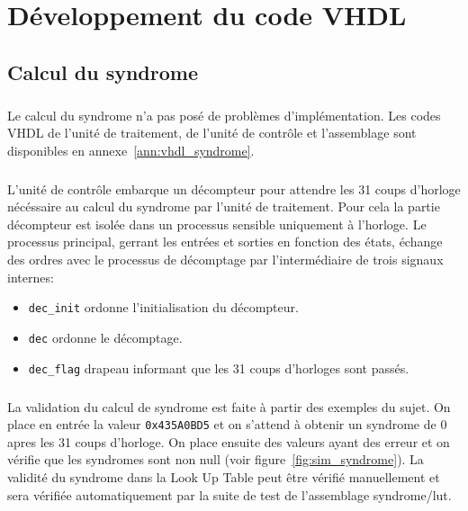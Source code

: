 \documentclass[a4paper, 11pt, svgnames]{report}
\begin{document}
    \chapter{Développement du code VHDL}
        \section{Calcul du syndrome}
            \paragraph{}
            Le calcul du syndrome n'a pas posé de problèmes d'implémentation.
            Les codes VHDL de l'unité de traitement, de l'unité de contrôle et
            l'assemblage sont disponibles en annexe~\ref{ann:vhdl_syndrome}.

            \paragraph{}
            L'unité de contrôle embarque un décompteur pour attendre les 31
            coups d'horloge nécéssaire au calcul du syndrome par l'unité de
            traitement. Pour cela la partie décompteur est isolée dans un
            processus sensible uniquement à l'horloge. Le processus principal,
            gerrant les entrées et sorties en fonction des états, échange des
            ordres avec le processus de décomptage par l'intermédiaire de trois
            signaux internes:
            \begin{itemize}
                \item \verb$dec_init$ ordonne l'initialisation du décompteur.
                \item \verb$dec$ ordonne le décomptage.
                \item \verb$dec_flag$ drapeau informant que les 31 coups
                    d'horloges sont passés.
            \end{itemize}

            \paragraph{}
            La validation du calcul de syndrome est faite à partir des exemples
            du sujet. On place en entrée la valeur \verb$0x435A0BD5$ et on
            s'attend à obtenir un syndrome de 0 apres les 31 coups d'horloge.
            On place ensuite des valeurs ayant des erreur et on vérifie que les
            syndromes sont non null (voir figure~\ref{fig:sim_syndrome}). La
            validité du syndrome dans la Look Up Table peut être vérifié
            manuellement et sera vérifiée automatiquement par la suite de test
            de l'assemblage syndrome/lut.
\end{document}
